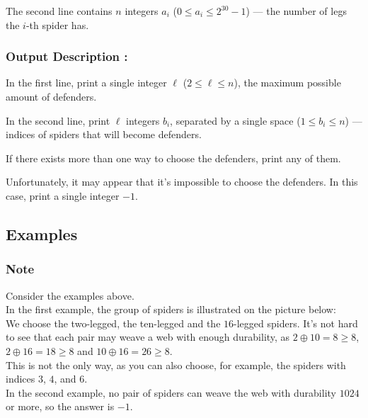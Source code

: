 \documentclass{article}
\begin{document}
The second line contains $n$ integers $a_i$ ($0 \le a_i \le 2^{30}-1$) — the number of legs the $i$-th spider has.
\paragraph{}
\subsubsection*{Output Description : }In the first line, print a single integer $\ell$ ($2 \le \ell \le n$), the maximum possible amount of defenders.

In the second line, print $\ell$ integers $b_i$, separated by a single space ($1 \le b_i \le n$) — indices of spiders that will become defenders.

If there exists more than one way to choose the defenders, print any of them.

Unfortunately, it may appear that it's impossible to choose the defenders. In this case, print a single integer $-1$.
\subsection*{Examples}
\subsubsection*{Note}Consider the examples above.\\ In the first example, the group of spiders is illustrated on the picture below:  \\ We choose the two-legged, the ten-legged and the $16$-legged spiders. It's not hard to see that each pair may weave a web with enough durability, as $2 \oplus 10 = 8 \ge 8$, $2 \oplus 16 = 18 \ge 8$ and $10 \oplus 16 = 26 \ge 8$.\\ This is not the only way, as you can also choose, for example, the spiders with indices $3$, $4$, and $6$.\\ In the second example, no pair of spiders can weave the web with durability $1024$ or more, so the answer is $-1$.
\end{document}
